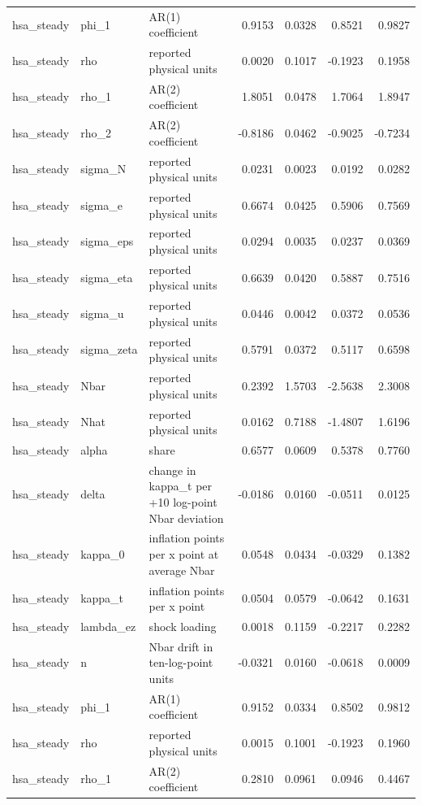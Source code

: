 \begin{tabular}{lllrrrr}
hsa\_steady & phi\_1 & AR(1) coefficient & 0.9153 & 0.0328 & 0.8521 & 0.9827 \\
hsa\_steady & rho & reported physical units & 0.0020 & 0.1017 & -0.1923 & 0.1958 \\
hsa\_steady & rho\_1 & AR(2) coefficient & 1.8051 & 0.0478 & 1.7064 & 1.8947 \\
hsa\_steady & rho\_2 & AR(2) coefficient & -0.8186 & 0.0462 & -0.9025 & -0.7234 \\
hsa\_steady & sigma\_N & reported physical units & 0.0231 & 0.0023 & 0.0192 & 0.0282 \\
hsa\_steady & sigma\_e & reported physical units & 0.6674 & 0.0425 & 0.5906 & 0.7569 \\
hsa\_steady & sigma\_eps & reported physical units & 0.0294 & 0.0035 & 0.0237 & 0.0369 \\
hsa\_steady & sigma\_eta & reported physical units & 0.6639 & 0.0420 & 0.5887 & 0.7516 \\
hsa\_steady & sigma\_u & reported physical units & 0.0446 & 0.0042 & 0.0372 & 0.0536 \\
hsa\_steady & sigma\_zeta & reported physical units & 0.5791 & 0.0372 & 0.5117 & 0.6598 \\
hsa\_steady & Nbar & reported physical units & 0.2392 & 1.5703 & -2.5638 & 2.3008 \\
hsa\_steady & Nhat & reported physical units & 0.0162 & 0.7188 & -1.4807 & 1.6196 \\
hsa\_steady & alpha & share & 0.6577 & 0.0609 & 0.5378 & 0.7760 \\
hsa\_steady & delta & change in kappa\_t per +10 log-point Nbar deviation & -0.0186 & 0.0160 & -0.0511 & 0.0125 \\
hsa\_steady & kappa\_0 & inflation points per x point at average Nbar & 0.0548 & 0.0434 & -0.0329 & 0.1382 \\
hsa\_steady & kappa\_t & inflation points per x point & 0.0504 & 0.0579 & -0.0642 & 0.1631 \\
hsa\_steady & lambda\_ez & shock loading & 0.0018 & 0.1159 & -0.2217 & 0.2282 \\
hsa\_steady & n & Nbar drift in ten-log-point units & -0.0321 & 0.0160 & -0.0618 & 0.0009 \\
hsa\_steady & phi\_1 & AR(1) coefficient & 0.9152 & 0.0334 & 0.8502 & 0.9812 \\
hsa\_steady & rho & reported physical units & 0.0015 & 0.1001 & -0.1923 & 0.1960 \\
hsa\_steady & rho\_1 & AR(2) coefficient & 0.2810 & 0.0961 & 0.0946 & 0.4467 \\

\end{tabular}
